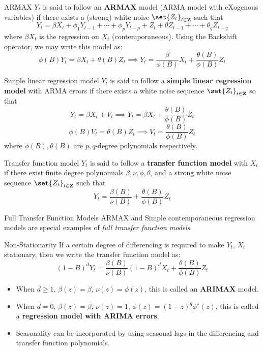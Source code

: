 \begin{Definition}{ARMAX}{}
    $ Y_t $ is said to follow an \textbf{ARMAX} model (ARMA model with eXogenous variables)
    if there exists a (strong) white noise $ \set{Z_t}_{t\in\mathbf{Z}} $
    such that
    \[ Y_t=\beta X_t+\phi_1 Y_{t-1}+\cdots+\phi_p Y_{t-p}+Z_t+\theta Z_{t-1}+\cdots+\theta_q Z_{t-q} \]
    where $ \beta X_t $ is the regression on $ X_t $ (contemporaneous). Using the Backshift
    operator, we may write this model as:
    \[ \phi(B)Y_t=\beta X_t+\theta(B)Z_t\implies Y_t=\frac{\beta}{\phi(B)}X_t +\frac{\theta(B)}{\phi(B)} Z_t \]
\end{Definition}
\begin{Definition}{Simple linear regression model}{}
    $ Y_t $ is said to follow a \textbf{simple linear regression model}
    with ARMA errors if there exists a white noise sequence $ \set{Z_t}_{t\in\mathbf{Z}} $
    so that
    \[ Y_t=\beta X_t+V_t\implies Y_t=\beta X_t+\frac{\theta(B)}{\phi(B)} Z_t \]
    \[ \phi(B)V_t=\theta(B)Z_t\implies V_t=\frac{\theta(B)}{\phi(B)} Z_t \]
    where $ \phi(B),\theta(B) $ are $ p,q $-degree polynomials respectively.
\end{Definition}
\begin{Definition}{Transfer function model}{}
    $ Y_t $ is said to follow a \textbf{transfer function model} with $ X_t $
    if there exist finite degree polynomials $ \beta,\nu,\phi,\theta $, and a strong
    white noise sequence $ \set{Z_t}_{t\in\mathbf{Z}} $ such that
    \[ Y_t=\frac{\beta(B)}{\nu(B)} +\frac{\theta(B)}{\phi(B)} Z_t \]
\end{Definition}
\begin{Example}{Full Transfer Function Models}{}
    ARMAX and Simple contemporaneous regression models are special examples
    of \emph{full transfer function models}.
\end{Example}
\begin{Remark}{Non-Stationarity}{}
    If a certain degree of differencing is required to make $ Y_t $, $ X_t $
    stationary, then we write the transfer function model as:
    \[ (1-B)^d Y_t=\frac{\beta(B)}{\nu(B)} (1-B)^d X_t+\frac{\theta(B)}{\phi(B)} Z_t \]
    \begin{itemize}
        \item When $ d\ge 1 $, $ \beta(z)=\beta $, $ \nu(z)=\phi(z) $, this is called
              an \textbf{ARIMAX} model.
        \item When $ d=0 $, $ \beta(z)=\beta $, $ \nu(z)=1 $, $ \phi(z)=(1-z)^q \phi^\star (z) $,
              this is called a \textbf{regression model with ARIMA errors}.
        \item Seasonality can be incorporated by using seasonal lags in the differencing
              and transfer function polynomials.
    \end{itemize}
\end{Remark}

